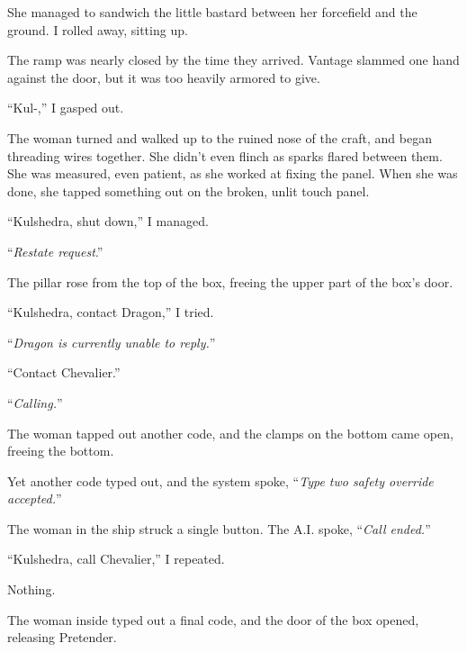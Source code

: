 She managed to sandwich the little bastard between her forcefield and the ground.  I rolled away, sitting up.



The ramp was nearly closed by the time they arrived.  Vantage slammed one hand against the door, but it was too heavily armored to give.



``Kul-,'' I gasped out.



The woman turned and walked up to the ruined nose of the craft, and began threading wires together.  She didn't even flinch as sparks flared between them.  She was measured, even patient, as she worked at fixing the panel.  When she was done, she tapped something out on the broken, unlit touch panel.



``Kulshedra, shut down,'' I managed.



``\emph{Restate request}.''



The pillar rose from the top of the box, freeing the upper part of the box's door.



``Kulshedra, contact Dragon,'' I tried.



``\emph{Dragon is currently unable to reply.}''



``Contact Chevalier.''



``\emph{Calling.}''



The woman tapped out another code, and the clamps on the bottom came open, freeing the bottom.



Yet another code typed out, and the system spoke, ``\emph{Type two safety override accepted.}''



The woman in the ship struck a single button.  The A.I. spoke, ``\emph{Call ended.}''



``Kulshedra, call Chevalier,'' I repeated.



Nothing.



The woman inside typed out a final code, and the door of the box opened, releasing Pretender.



